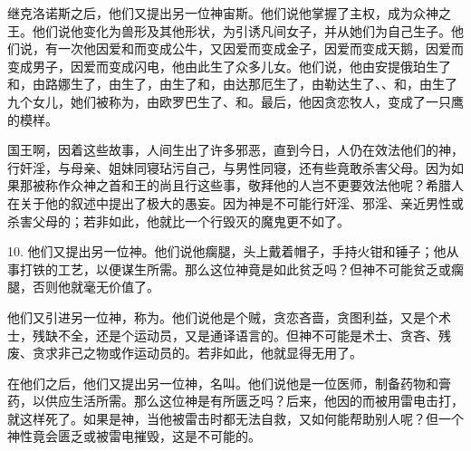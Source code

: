 继克洛诺斯之后，他们又提出另一位神宙斯。他们说他掌握了主权，成为众神之王。他们说他变化为兽形及其他形状，为引诱凡间女子，并从她们为自己生子。他们说，有一次他因爱和而变成公牛，又因爱而变成金子，因爱而变成天鹅，因爱而变成男子，因爱而变成闪电，他由此生了众多儿女。他们说，他由安提俄珀生了和，由路娜生了，由生了，由生了和，由达那厄生了，由勒达生了、、和，由生了九个女儿，她们被称为，由欧罗巴生了、和。最后，他因贪恋牧人，变成了一只鹰的模样。\par

国王啊，因着这些故事，人间生出了许多邪恶，直到今日，人仍在效法他们的神，行奸淫，与母亲、姐妹同寝玷污自己，与男性同寝，还有些竟敢杀害父母。因为如果那被称作众神之首和王的尚且行这些事，敬拜他的人岂不更要效法他呢？希腊人在关于他的叙述中提出了极大的愚妄。因为神是不可能行奸淫、邪淫、亲近男性或杀害父母的；若非如此，他就比一个行毁灭的魔鬼更不如了。\par

10. 他们又提出另一位神。他们说他瘸腿，头上戴着帽子，手持火钳和锤子；他从事打铁的工艺，以便谋生所需。那么这位神竟是如此贫乏吗？但神不可能贫乏或瘸腿，否则他就毫无价值了。\par

他们又引进另一位神，称为。他们说他是个贼，贪恋吝啬，贪图利益，又是个术士，残缺不全，还是个运动员，又是通译语言的。但神不可能是术士、贪吝、残废、贪求非己之物或作运动员的。若非如此，他就显得无用了。\par

在他们之后，他们又提出另一位神，名叫。他们说他是一位医师，制备药物和膏药，以供应生活所需。那么这位神是有所匮乏吗？后来，他因的而被用雷电击打，就这样死了。如果是神，当他被雷击时都无法自救，又如何能帮助别人呢？但一个神性竟会匮乏或被雷电摧毁，这是不可能的。\par


